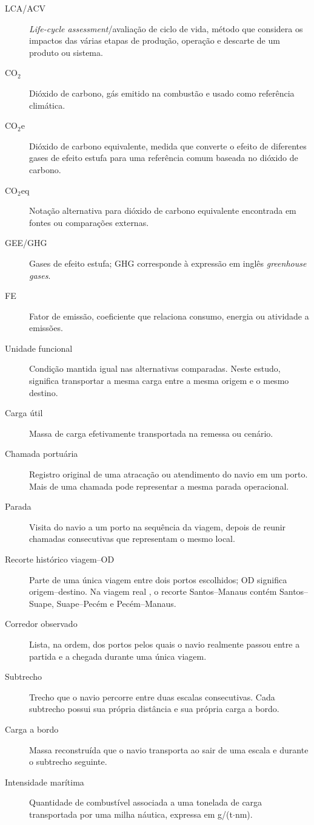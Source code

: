 \documentclass[12pt,a4paper,oneside]{report}
\newcommand{\cooe}{CO$_2$e}
\newcommand{\codecell}[1]{\texttt{\seqsplit{#1}}}
\begin{document}
\begin{description}
  \item[LCA/ACV] \textit{Life-cycle assessment}/avaliação de ciclo de vida, método que considera os impactos das várias etapas de produção, operação e descarte de um produto ou sistema.
  \item[CO$_2$] Dióxido de carbono, gás emitido na combustão e usado como referência climática.
  \item[\cooe{}] Dióxido de carbono equivalente, medida que converte o efeito de diferentes gases de efeito estufa para uma referência comum baseada no dióxido de carbono.
  \item[CO$_2$eq] Notação alternativa para dióxido de carbono equivalente encontrada em fontes ou comparações externas.
  \item[GEE/GHG] Gases de efeito estufa; GHG corresponde à expressão em inglês \textit{greenhouse gases}.
  \item[FE] Fator de emissão, coeficiente que relaciona consumo, energia ou atividade a emissões.
  \item[Unidade funcional] Condição mantida igual nas alternativas comparadas. Neste estudo, significa transportar a mesma carga entre a mesma origem e o mesmo destino.
  \item[Carga útil] Massa de carga efetivamente transportada na remessa ou cenário.
  \item[Chamada portuária] Registro original de uma atracação ou atendimento do navio em um porto. Mais de uma chamada pode representar a mesma parada operacional.
  \item[Parada] Visita do navio a um porto na sequência da viagem, depois de reunir chamadas consecutivas que representam o mesmo local.
  \item[Recorte histórico viagem--OD] Parte de uma única viagem entre dois portos escolhidos; OD significa origem--destino. Na viagem real \codecell{voyage\_9612791\_00011}, o recorte Santos--Manaus contém Santos--Suape, Suape--Pecém e Pecém--Manaus.
  \item[Corredor observado] Lista, na ordem, dos portos pelos quais o navio realmente passou entre a partida e a chegada durante uma única viagem.
  \item[Subtrecho] Trecho que o navio percorre entre duas escalas consecutivas. Cada subtrecho possui sua própria distância e sua própria carga a bordo.
  \item[Carga a bordo] Massa reconstruída que o navio transporta ao sair de uma escala e durante o subtrecho seguinte.
  \item[Intensidade marítima] Quantidade de combustível associada a uma tonelada de carga transportada por uma milha náutica, expressa em g/(t$\cdot$nm).

\end{description}
\end{document}
